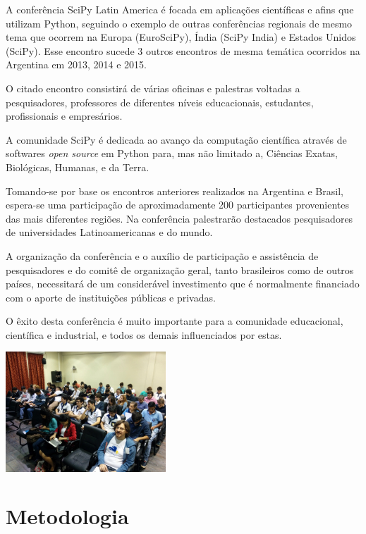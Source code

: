 \documentclass[report,a4paper,twocolumn]{memoir}
\begin{document}
A conferência SciPy Latin America é focada em aplicações científicas e afins que
utilizam Python, seguindo o exemplo de outras conferências regionais de mesmo tema que ocorrem na Europa (EuroSciPy), Índia (SciPy India) e Estados Unidos (SciPy). Esse encontro sucede 3 outros encontros de mesma temática ocorridos na Argentina em 2013, 2014 e 2015.

O citado encontro consistirá de várias oficinas e palestras voltadas a pesquisadores, professores de diferentes níveis educacionais, estudantes, profissionais e empresários.

A comunidade SciPy é dedicada ao avanço da computação científica através de softwares \emph{open source} em Python para, mas não limitado a, Ciências Exatas, Biológicas, Humanas, e da Terra.

Tomando-se por base os encontros anteriores realizados na Argentina e Brasil, espera-se uma participação de aproximadamente 200 participantes provenientes das mais diferentes regiões. Na conferência palestrarão destacados pesquisadores de universidades Latinoamericanas e do mundo.

A organização da conferência e o auxílio de participação e assistência de pesquisadores e do comitê de organização geral, tanto brasileiros como de outros países, 
necessitará de
%
um considerável investimento que é normalmente financiado com o aporte de instituições públicas e privadas. 

O êxito desta conferência é muito importante para a comunidade educacional, científica e industrial, e todos os demais influenciados por estas.

\begin{center}
\includegraphics[width=6cm]{imagens/IMG_20150521_102157-small.jpg}
\end{center}

\chapter*{Metodologia}
\end{document}

